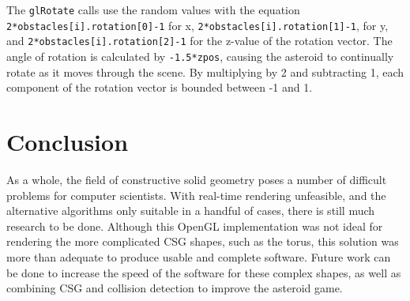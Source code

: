 \documentclass[12pt]{article}
\begin{document}
\begin{doublespace}
The \texttt{glRotate} calls use the random values with the equation \texttt{2*obstacles[i].rotation[0]-1} for x, \texttt{2*obstacles[i].rotation[1]-1}, for y, and \texttt{2*obstacles[i].rotation[2]-1} for the z-value of the rotation vector. The angle of rotation is calculated by \texttt{-1.5*zpos}, causing the asteroid to continually rotate as it moves through the scene. By multiplying by 2 and subtracting 1, each component of the rotation vector is bounded between -1 and 1.
\section{Conclusion}
As a whole, the field of constructive solid geometry poses a number of difficult problems for computer scientists. With real-time rendering unfeasible, and the alternative algorithms only suitable in a handful of cases, there is still much research to be done. Although this OpenGL implementation was not ideal for rendering the more complicated CSG shapes, such as the torus, this solution was more than adequate to produce usable and complete software. Future work can be done to increase the speed of the software for these complex shapes, as well as combining CSG and collision detection to improve the asteroid game.
\newpage
\end{doublespace}
\end{document}
